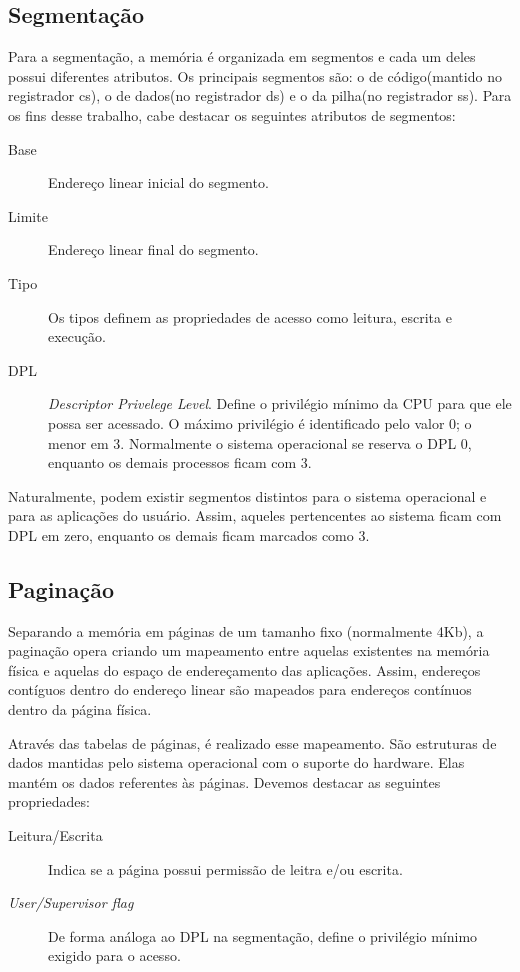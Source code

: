 		\subsection{Segmentação}
			Para a segmentação, a memória é organizada em segmentos e cada um deles possui diferentes atributos.
			Os principais segmentos são: o de código(mantido no registrador cs), o de dados(no registrador ds)
			e o da pilha(no registrador ss). Para os fins desse trabalho, cabe destacar os seguintes atributos
			de segmentos:
			\begin{description}
				\item[Base]
					Endereço linear inicial do segmento.
				\item[Limite]
					Endereço linear final do segmento.
				\item[Tipo]
					Os tipos definem as propriedades de acesso como leitura, escrita e execução.
				\item[DPL]
					\textsl{Descriptor Privelege Level}. Define o privilégio mínimo da CPU para
					que ele possa ser acessado. O máximo privilégio é identificado pelo valor 0;
					o menor em 3. Normalmente o sistema operacional se reserva o DPL 0, enquanto
					os demais processos ficam com 3.
			\end{description}
			Naturalmente, podem existir segmentos distintos para o sistema operacional e
			para as aplicações do usuário. Assim, aqueles pertencentes ao sistema ficam
			com DPL em zero, enquanto os demais ficam marcados como 3.


		\subsection{Paginação}
			Separando a memória em páginas de um tamanho fixo (normalmente 4Kb), 
			a paginação opera criando um mapeamento
			entre aquelas existentes na memória física e aquelas do espaço de endereçamento
			das aplicações. Assim, endereços contíguos dentro do endereço linear são mapeados
			para endereços contínuos dentro da página física.

	
			Através das tabelas de páginas, é realizado esse mapeamento. São estruturas de dados
			mantidas pelo sistema operacional com o suporte do hardware. Elas mantém
			os dados referentes às páginas. Devemos destacar as seguintes propriedades:
			\begin{description}
				\item[Leitura/Escrita]
					Indica se a página possui permissão de leitra e/ou escrita.
				\item[\textsl{User/Supervisor flag}]
					De forma análoga ao DPL na segmentação, define o privilégio mínimo exigido
					para o acesso.
			\end{description}

